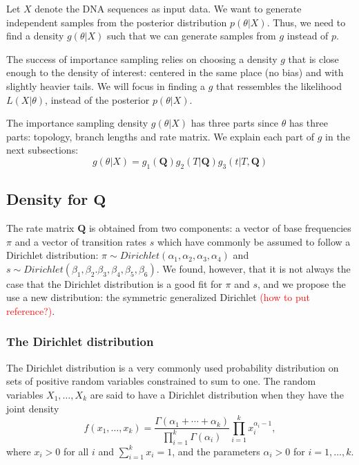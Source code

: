 \documentclass[useAMS,usenatbib]{biom}
\newcommand{\falta}[1]{\textcolor{red}{#1}}
\begin{document}
Let $X$ denote the DNA sequences as input data. We want to generate
independent samples from the posterior distribution
$p(\theta|X)$. Thus, we need to find a density $g(\theta|X)$ such that
we can generate samples from $g$ instead of $p$.

The success of importance sampling relies on choosing a density $g$
that is close enough to the density of interest: centered in the same
place (no bias) and with slightly heavier tails. We will focus in
finding a $g$ that ressembles the likelihood $L(X|\theta)$, instead of
the posterior $p(\theta|X)$.

The importance sampling density $g(\theta|X)$ has three parts since
$\theta$ has three parts: topology, branch lengths and rate matrix. We
explain each part of $g$ in the next subsections:
\begin{equation}
g(\theta|X) = g_1(\mathbf{Q})g_2(T|\mathbf{Q})g_3(t|T,\mathbf{Q})
\end{equation}

\subsection{Density for $\mathbf{Q}$}
The rate matrix $\mathbf{Q}$ is obtained from two components: a vector
of base frequencies $\pi$ and a vector of transition rates $s$ which
have commonly be assumed to follow a Dirichlet distribution: $\pi\sim
Dirichlet(\alpha_1,\alpha_2,\alpha_3,\alpha_4)$ and $s\sim
Dirichlet(\beta_1,\beta_2.\beta_3,\beta_4,\beta_5,\beta_6)$. 
We found, however, that it is not always the case that the Dirichlet
distribution is a good fit for $\pi$ and $s$, and we propose the use a
new distribution: the symmetric generalized Dirichlet \falta{(how to
  put reference?)}.

\subsubsection{The Dirichlet distribution}
The Dirichlet distribution is a very commonly used probability distribution
on sets of positive random variables constrained to sum to one.
The random variables $X_1,\ldots,X_k$ are said to have a Dirichlet distribution
when they have the joint density
\begin{equation}
  f(x_1,\ldots,x_k) = \frac{\Gamma(\alpha_1 + \cdots + \alpha_k)}{\prod_{i=1}^k \Gamma(\alpha_i)} \prod_{i=1}^k x_i^{\alpha_i - 1},
\end{equation}
where $x_i > 0$ for all $i$ and $\sum_{i=1}^k x_i = 1$, and the
parameters $\alpha_i > 0$ for $i=1,\ldots,k$.
\end{document}

